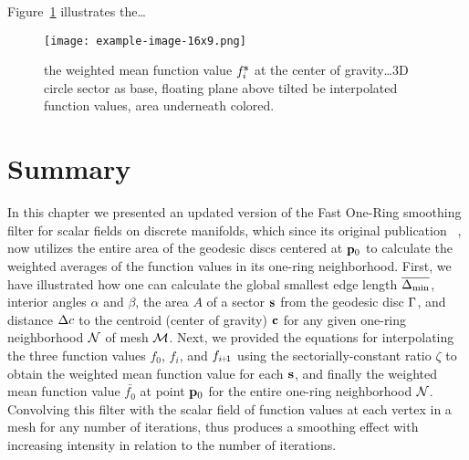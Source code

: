 Figure~\ref{fig:weightedMean} illustrates the\dots
\begin{figure}[ht]
\ffigbox
	{\texttt{[image: example-image-16x9.png]}}
	{\caption[Weighted Mean function value $f^\bs_i$ at the center of gravity]{the weighted mean function value $f^\bs_i$ at the center of gravity\ldots 3D circle sector as base, floating plane above tilted be interpolated function values, area underneath colored.}\label{fig:weightedMean}}
\end{figure}
%
\section{Summary}
\label{cFONSsS}
In this chapter we presented an updated version of the Fast One-Ring smoothing filter for scalar fields on discrete manifolds, which since its original publication ~\cite[s.~3.2]{Mara17}, now utilizes the entire area of the geodesic discs centered at $\mathbf{p}_0$ to calculate the weighted averages of the function values in its one-ring neighborhood. First, we have illustrated how one can calculate the global smallest edge length $\overline{\Delta_\text{min}}$, interior angles $\alpha$ and $\beta$, the area $A$ of a sector $\mathbf{s}$ from the geodesic disc $\Gamma$, and distance $\Delta c$ to the centroid (center of gravity) $\mathbf{c}$ for any given one-ring neighborhood $\mathcal{N}$ of mesh $\mathcal{M}$. Next, we provided the equations for interpolating the three function values $f_0$, $f_i$, and $f_{\sipo}$ using the sectorially-constant ratio $\zeta$ to obtain the weighted mean function value for each $\mathbf{s}$, and finally the weighted mean function value $\bar{f_0}$ at point ${\mathbf{p}_0}$ for the entire one-ring neighborhood $\mathcal{N}$. Convolving this filter with the scalar field of function values at each vertex in a mesh for any number of iterations, thus produces a smoothing effect with increasing intensity in relation to the number of iterations.
